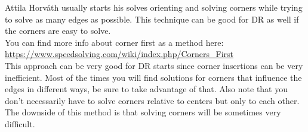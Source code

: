 \documentclass[11pt,a4paper]{book}
\begin{document}
Attila Horváth usually starts his solves orienting and solving corners while trying to solve as many edges as possible. This technique can be good for DR as well if the corners are easy to solve. \\
\newline
You can find more info about corner first as a method here: \url{https://www.speedsolving.com/wiki/index.php/Corners\_First}\\
\newline
This approach can be very good for DR starts since corner insertions can be very inefficient. Most of the times you will find solutions for corners that influence the edges in different ways, be sure to take advantage of that. Also note that you don’t necessarily have to solve corners relative to centers but only to each other. The downside of this method is that solving corners will be sometimes very difficult.\\
\end{document}
